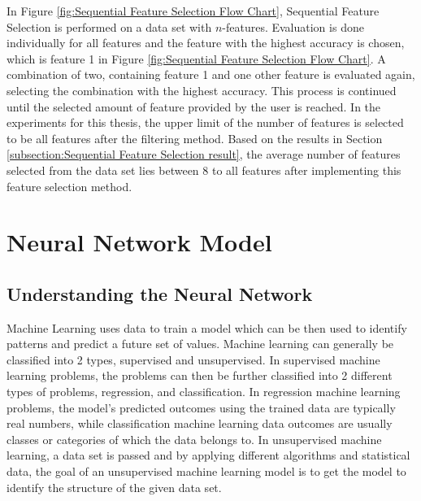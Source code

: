 \documentclass{tum-book}
\begin{document}
        \noindent
        In Figure \ref{fig:Sequential Feature Selection Flow Chart}, Sequential Feature Selection is performed on a data set with $n$-features. Evaluation is done individually for all features and the feature with the highest accuracy is chosen, which is feature 1 in Figure \ref{fig:Sequential Feature Selection Flow Chart}. A combination of two, containing feature 1 and one other feature is evaluated again, selecting the combination with the highest accuracy. This process is continued until the selected amount of feature provided by the user is reached. In the experiments for this thesis, the upper limit of the number of features is selected to be all features after the filtering method. Based on the results in Section \ref{subsection:Sequential Feature Selection result}, the average number of features selected from the data set lies between 8 to all features after implementing this feature selection method.
    



\chapter{Neural Network Model}\label{chapter:neural network model}
    \section{Understanding the Neural Network}\label{section:understanding the neural network}
    Machine Learning\cite{Learnhow39:online} uses data to train a model which can be then used to identify patterns and predict a future set of values. Machine learning can generally be classified into 2 types, supervised and unsupervised. In supervised machine learning problems, the problems can then be further classified into 2 different types of problems, regression, and classification. In regression machine learning problems, the model’s predicted outcomes using the trained data are typically real numbers, while classification machine learning data outcomes are usually classes or categories of which the data belongs to. In unsupervised machine learning, a data set is passed and by applying different algorithms and statistical data, the goal of an unsupervised machine learning model is to get the model to identify the structure of the given data set.
\end{document}
